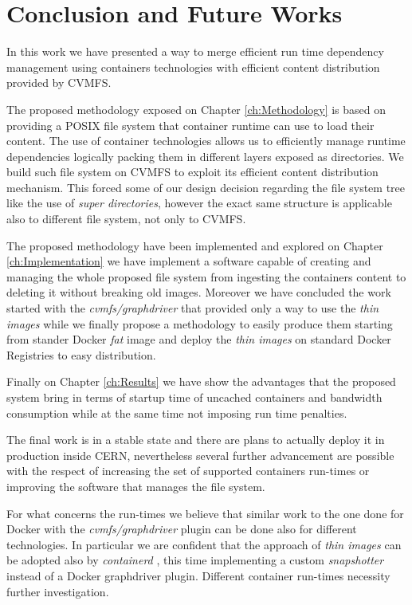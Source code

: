 \chapter{Conclusion and Future Works}\label{ch:FutureWorks}

In this work we have presented a way to merge efficient run time dependency
management using containers technologies with efficient content distribution
provided by CVMFS. 

The proposed methodology exposed on Chapter \ref{ch:Methodology} is based on
providing a POSIX file system that container runtime can use to load their
content. The use of container technologies allows us to efficiently manage
runtime dependencies logically packing them in different layers exposed as
directories.  We build such file system on CVMFS to exploit its efficient
content distribution mechanism. This forced some of our design decision
regarding the file system tree like the use of \textit{super directories},
however the exact same structure is applicable also to different file system,
not only to CVMFS. 

The proposed methodology have been implemented and explored on Chapter
\ref{ch:Implementation} we have implement a software capable of creating and
managing the whole proposed file system from ingesting the containers content
to deleting it without breaking old images. Moreover we have concluded the work
started with the \textit{cvmfs/graphdriver} that provided only a way to use the
\textit{thin images} while we finally propose a methodology to easily produce
them starting from stander Docker \textit{fat} image and deploy the
\textit{thin images} on standard Docker Registries to easy distribution.

Finally on Chapter \ref{ch:Results} we have show the advantages that the
proposed system bring in terms of startup time of uncached containers and
bandwidth consumption while at the same time not imposing run time penalties.

The final work is in a stable state and there are plans to actually deploy it
in production inside CERN, nevertheless several further advancement are
possible with the respect of increasing the set of supported containers
run-times or improving the software that manages the file system.

For what concerns the run-times we believe that similar work to the one done
for Docker with the \textit{cvmfs/graphdriver} plugin can be done also for
different technologies. In particular we are confident that the approach of
\textit{thin images} can be adopted also by \textit{containerd}
\cite{containerd}, this time implementing a custom \textit{snapshotter} instead
of a Docker graphdriver plugin. Different container run-times necessity further
investigation.

